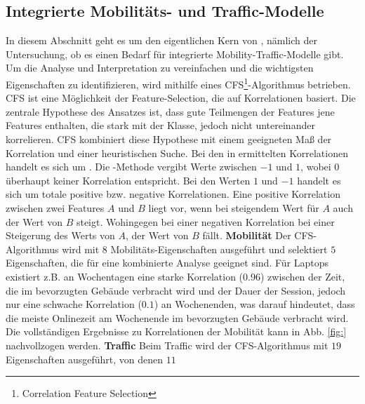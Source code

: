 \documentclass[12pt, a4paper]{article}
\begin{document}
\subsection{Integrierte Mobilitäts- und Traffic-Modelle}
In diesem Abschnitt geht es um den eigentlichen Kern von \cite{Alipour2018}, nämlich der Untersuchung, ob es einen Bedarf
für integrierte Mobility-Traffic-Modelle gibt. Um die Analyse und Interpretation zu vereinfachen und die 
wichtigsten Eigenschaften zu identifizieren, wird mithilfe eines \textsc{CFS}\footnote{Correlation Feature Selection}-Algorithmus
 betrieben. \textsc{CFS} ist eine Möglichkeit der Feature-Selection, die auf Korrelationen
basiert. Die zentrale Hypothese des Ansatzes ist, dass gute Teilmengen der Features jene Features enthalten, die stark
mit der Klasse, jedoch nicht untereinander korrelieren. \textsc{CFS} kombiniert diese Hypothese mit einem geeigneten
Maß der Korrelation und einer heuristischen Suche. \cite{Hall2000}
Bei den in \cite{Alipour2018} ermittelten Korrelationen handelt es sich um .
Die -Methode vergibt Werte zwischen $-1$ und $1$, wobei $0$ überhaupt keiner Korrelation
entspricht. Bei den Werten $1$ und $-1$ handelt es sich um totale positive bzw. negative Korrelationen.
Eine positive Korrelation zwischen zwei Features $A$ und $B$ liegt vor, wenn bei steigendem Wert für $A$
auch der Wert von $B$ steigt. Wohingegen bei einer negativen Korrelation bei einer Steigerung des Werts von $A$, 
der Wert von $B$ fällt. \cite{Nettleton2014}
\newline\newline
\textbf{Mobilität}\newline
Der \textsc{CFS}-Algorithmus wird mit $8$ Mobilitäts-Eigenschaften ausgeführt und selektiert $5$ Eigenschaften, 
die für eine kombinierte Analyse geeignet sind. Für Laptops existiert z.B. an Wochentagen eine starke Korrelation ($0.96$)
zwischen der Zeit, die im bevorzugten Gebäude verbracht wird und der Dauer der Session, jedoch nur eine schwache Korrelation
($0.1$) an Wochenenden, was darauf hindeutet, dass die meiste Onlinezeit am Wochenende im bevorzugten
Gebäude verbracht wird. \cite{Alipour2018} Die vollständigen Ergebnisse zu Korrelationen der Mobilität kann in
Abb. \ref{fig:} nachvollzogen werden.
\newline\newline
\textbf{Traffic}\newline
Beim Traffic wird der \textsc{CFS}-Algorithmus mit $19$ Eigenschaften ausgeführt, von denen $11$
\end{document}
